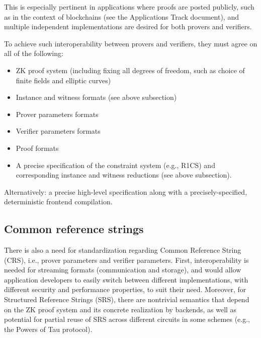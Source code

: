This is especially pertinent in applications where proofs are posted publicly, such as in the context of blockchains (see the Applications Track document), and multiple independent implementations are desired for both provers and verifiers.

To achieve such interoperability between provers and verifiers, they must agree on all of the following:
\begin{itemize}
    \item ZK proof system (including fixing all degrees of freedom, such as choice of finite fields and elliptic curves)
    \item Instance and witness formats (see above subsection)
    \item Prover parameters formats
    \item Verifier parameters formats
    \item Proof formats
    \item A precise specification of the constraint system (e.g., R1CS) and corresponding instance and witness reductions (see above subsection).
\end{itemize}

Alternatively: a precise high-level specification along with a precisely-specified, deterministic frontend compilation.


\subsection{Common reference strings}
There is also a need for standardization regarding Common Reference String (CRS), i.e., prover parameters and verifier parameters. First, interoperability is needed for streaming formats (communication and storage), and would allow application developers to easily switch between different implementations, with different security and performance properties, to suit their need. Moreover, for Structured Reference Strings (SRS), there are nontrivial semantics that depend on the ZK proof system and its concrete realization by backends, as well as potential for partial reuse of SRS across different circuits in some schemes (e.g., the Powers of Tau protocol). 

